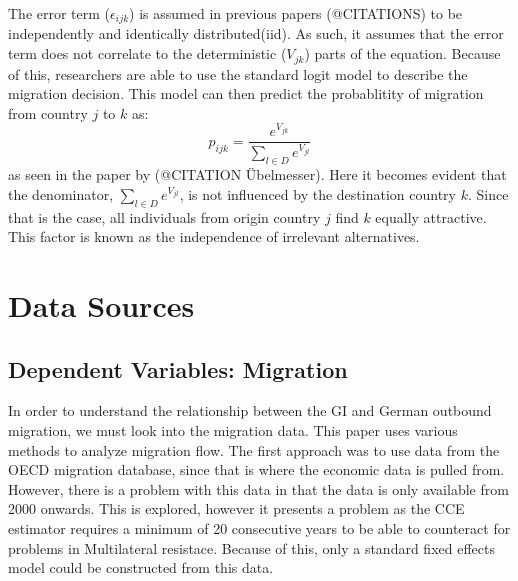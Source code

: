\documentclass[]{article}
\begin{document}
The error term (\(\epsilon_{ijk}\)) is assumed in previous papers
(@CITATIONS) to be independently and identically distributed(iid). As
such, it assumes that the error term does not correlate to the
deterministic (\(V_{jk}\)) parts of the equation. Because of this,
researchers are able to use the standard logit model to describe the
migration decision. This model can then predict the probablitity of
migration from country \(j\) to \(k\) as:
\[ p_{ijk} = \frac{e^{V_{jk}}}{\sum_{l\in D}e^{V_{jl}}}\] as seen in the
paper by (@CITATION Übelmesser). Here it becomes evident that the
denominator, \({\sum_{l\in D}e^{V_{jl}}}\), is not influenced by the
destination country \(k\). Since that is the case, all individuals from
origin country \(j\) find \(k\) equally attractive. This factor is known
as the independence of irrelevant alternatives.

\section{Data Sources}\label{data-sources}

\subsection{Dependent Variables:
Migration}\label{dependent-variables-migration}

In order to understand the relationship between the GI and German
outbound migration, we must look into the migration data. This paper
uses various methods to analyze migration flow. The first approach was
to use data from the OECD migration database, since that is where the
economic data is pulled from. However, there is a problem with this data
in that the data is only available from 2000 onwards. This is explored,
however it presents a problem as the CCE estimator requires a minimum of
20 consecutive years to be able to counteract for problems in
Multilateral resistace. Because of this, only a standard fixed effects
model could be constructed from this data.
\end{document}
